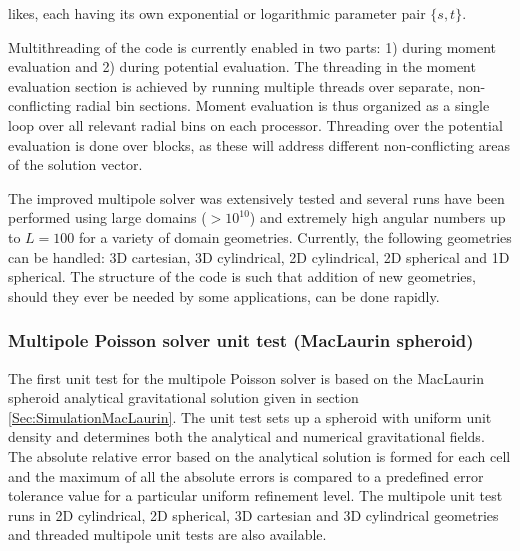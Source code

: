 likes, each having its own exponential or logarithmic parameter pair $\{s,t\}$.
\par
Multithreading of the code is currently enabled in two parts: 1) during moment evaluation and 2)
during potential evaluation. The threading in the moment evaluation section is achieved by
running multiple threads over separate, non-conflicting radial bin sections. Moment evaluation
is thus organized as a single loop over all relevant radial bins on each processor. Threading
over the potential evaluation is done over blocks, as these will address different non-conflicting
areas of the solution vector.
\par
The improved multipole solver was extensively tested and several runs have been performed
using large domains ($>10^{10}$) and extremely high angular numbers up to $L=100$ for a variety
of domain geometries. Currently, the following geometries can be handled: 3D cartesian,
3D cylindrical, 2D cylindrical, 2D spherical and 1D spherical. The structure of the code is
such that addition of new geometries, should they ever be needed by some applications,
can be done rapidly. 


\subsubsection{Multipole Poisson solver unit test (MacLaurin spheroid)}
\label{Sec:GridSolversMultipoleUnitTest1}

The first unit test for the multipole Poisson solver is based on the MacLaurin spheroid analytical
gravitational solution given in section \ref{Sec:SimulationMacLaurin}. The unit test sets up
a spheroid with uniform unit density and determines both the analytical and numerical gravitational
fields. The absolute relative error based on the analytical solution is formed for each cell
and the maximum of all the absolute errors is compared to a predefined error tolerance value
for a particular uniform refinement level. The multipole unit test runs in 2D cylindrical,
2D spherical, 3D cartesian and 3D cylindrical geometries and threaded multipole unit tests are
also available.

